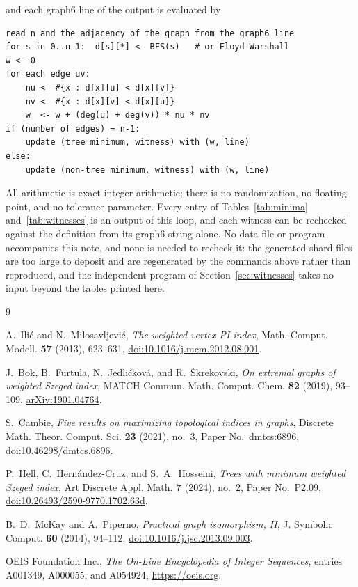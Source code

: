 \documentclass[11pt]{amsart}
\begin{document}
\noindent
and each graph6 line of the output is evaluated by

\begin{verbatim}
read n and the adjacency of the graph from the graph6 line
for s in 0..n-1:  d[s][*] <- BFS(s)   # or Floyd-Warshall
w <- 0
for each edge uv:
    nu <- #{x : d[x][u] < d[x][v]}
    nv <- #{x : d[x][v] < d[x][u]}
    w  <- w + (deg(u) + deg(v)) * nu * nv
if (number of edges) = n-1:
    update (tree minimum, witness) with (w, line)
else:
    update (non-tree minimum, witness) with (w, line)
\end{verbatim}

\noindent
All arithmetic is exact integer arithmetic; there is no randomization,
no floating point, and no tolerance parameter. Every entry of
Tables~\ref{tab:minima} and~\ref{tab:witnesses} is an output of this
loop, and each witness can be rechecked against the definition from
its graph6 string alone. No data file or program accompanies this note,
and none is needed to recheck it: the generated shard files are too
large to deposit and are regenerated by the commands above rather than
reproduced, and the independent program of
Section~\ref{sec:witnesses} takes no input beyond the tables printed
here.

\begin{thebibliography}{9}

A.~Ili\'c and N.~Milosavljevi\'c,
\emph{The weighted vertex PI index},
Math. Comput. Modell. \textbf{57} (2013), 623--631,
\href{https://doi.org/10.1016/j.mcm.2012.08.001}
{doi:10.1016/j.mcm.2012.08.001}.

J.~Bok, B.~Furtula, N.~Jedli\v{c}kov\'a, and R.~\v{S}krekovski,
\emph{On extremal graphs of weighted Szeged index},
MATCH Commun. Math. Comput. Chem. \textbf{82} (2019), 93--109,
\href{https://arxiv.org/abs/1901.04764}{arXiv:1901.04764}.

S.~Cambie,
\emph{Five results on maximizing topological indices in graphs},
Discrete Math. Theor. Comput. Sci. \textbf{23} (2021), no.~3,
Paper No.~dmtcs:6896,
\href{https://doi.org/10.46298/dmtcs.6896}{doi:10.46298/dmtcs.6896}.

P.~Hell, C.~Hern\'andez-Cruz, and S.~A.~Hosseini,
\emph{Trees with minimum weighted Szeged index},
Art Discrete Appl. Math. \textbf{7} (2024), no.~2,
Paper No.~P2.09,
\href{https://doi.org/10.26493/2590-9770.1702.63d}
{doi:10.26493/2590-9770.1702.63d}.

B.~D.~McKay and A.~Piperno,
\emph{Practical graph isomorphism, II},
J. Symbolic Comput. \textbf{60} (2014), 94--112,
\href{https://doi.org/10.1016/j.jsc.2013.09.003}
{doi:10.1016/j.jsc.2013.09.003}.

OEIS Foundation Inc.,
\emph{The On-Line Encyclopedia of Integer Sequences},
entries A001349, A000055, and A054924,
\url{https://oeis.org}.

\end{thebibliography}
\end{document}
